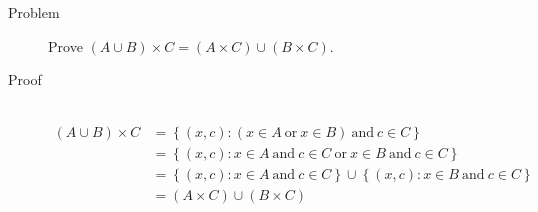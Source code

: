 \begin{description}
\item[Problem]
Prove $(A \cup B) \times C = (A \times C) \cup (B \times C)$.

\item[Proof]~\\
\begin{equation*}
\begin{aligned}
(A \cup B) \times C &= \left\{ (x, c) : (x \in A\ \text{or}\ x \in B)\ 
\text{and}\ c \in C\right\} \\
&= \left\{ (x, c) : x \in A\ \text{and}\ c \in C\ \text{or}\ x \in B\ 
\text{and}\ c \in C\right\} \\
&= \left\{ (x, c) : x \in A\ \text{and}\ c \in C \right\} \cup
\left\{ (x, c) : x \in B\ \text{and}\ c \in C \right\} \\
&= (A \times C) \cup (B \times C)
\end{aligned}
\end{equation*}

\end{description}
